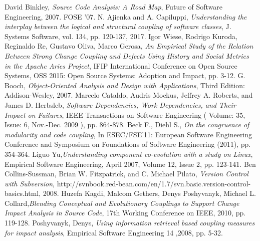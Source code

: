 \documentclass[conference,compsoc]{IEEEtran}
\begin{document}
\begin{thebibliography}{1}

David Binkley, \emph{Source Code Analysis: A Road Map}, Future of Software Engineering, 2007. FOSE '07.
N. Ajienka and A. Capiluppi, \emph{Understanding the interplay between the logical and structural coupling of software classes}, J. Systems Software, vol. 134, pp. 120-137, 2017.
Igor Wiese, Rodrigo Kuroda, Reginaldo Re, Gustavo Oliva, Marco Gerosa, \emph{An Empirical Study of the Relation Between Strong Change Coupling and Defects Using History and Social Metrics in the Apache Aries Project}, IFIP International Conference on Open Source Systems, OSS 2015: Open Source Systems: Adoption and Impact, pp. 3-12.
G. Booch, \emph{Object-Oriented Analysis and Design with Applications}, Third Edition: Addison-Wesley, 2007.
Marcelo Cataldo, Audris Mockus, Jeffrey A. Roberts, and James D. Herbsleb, \emph{Software Dependencies, Work Dependencies, and Their Impact on Failures},  IEEE Transactions on Software Engineering ( Volume: 35, Issue: 6, Nov.-Dec. 2009 ), pp. 864-878.
Beck F., Diehl S.,\emph{ On the congruence of modularity and code coupling}, In ESEC/FSE'11: European Software Engineering Conference and Symposium on Foundations of Software Engineering (2011), pp. 354-364.
Liguo Yu,\emph{Understanding component co-evolution with a study on Linux}, Empirical Software Engineering, April 2007, Volume 12, Issue 2, pp. 123-141.
 Ben Collins-Sussman, Brian W. Fitzpatrick, and C. Michael Pilato, \emph{Version Control with Subversion}, http://svnbook.red-bean.com/en/1.7/svn.basic.version-control-basics.html, 2008.
 Huzefa Kagdi, Malcom Gethers, Denys Poshyvanyk, Michael L. Collard,\emph{Blending Conceptual and Evolutionary Couplings to Support Change Impact Analysis in Source Code}, 17th Working Conference on IEEE, 2010, pp. 119-128.
Poshyvanyk, Denys, \emph{Using information retrieval based coupling measures for impact analysis}, Empirical Software Engineering 14 ,2008, pp. 5-32.

\end{thebibliography}
\end{document}
